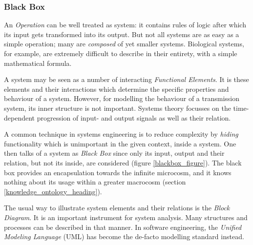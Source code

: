 %
%
%
%
%
%
%

\subsubsection{Black Box}
\label{black_box_heading}

An \emph{Operation} can be well treated as system: it contains rules of logic
after which its input gets transformed into its output. But not all systems are
as easy as a simple operation; many are \emph{composed} of yet smaller systems.
Biological systems, for example, are extremely difficult to describe in their
entirety, with a simple mathematical formula.

A system may be seen as a number of interacting \emph{Functional Elements}. It
is these elements and their interactions which determine the specific
properties and behaviour of a system. However, for modelling the behaviour of a
transmission system, its inner structure is not important. Systems theory
focusses on the time-dependent progression of input- and output signals as well
as their relation.

A common technique in systems engineering is to reduce complexity by
\emph{hiding} functionality which is unimportant in the given context, inside a
system. One then talks of a system as \emph{Black Box} since only its input,
output and their relation, but not its inside, are considered (figure
\ref{blackbox_figure}). The black box provides an encapsulation towards the
infinite microcosm, and it knows nothing about its usage within a greater
macrocosm (section \ref{knowledge_ontology_heading}).

The usual way to illustrate system elements and their relations is the
\emph{Block Diagram}. It is an important instrument for system analysis. Many
structures and processes can be described in that manner. In software
engineering, the \emph{Unified Modeling Language} (UML) has become the de-facto
modelling standard instead.
